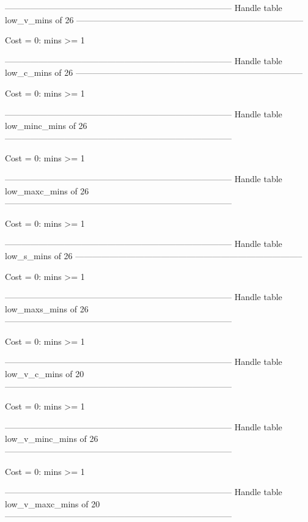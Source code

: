 --------------------------------------------------------------------------------
Handle table low_v_mins of 26
--------------------------------------------------------------------------------

Cost =  0:  mins >= 1

--------------------------------------------------------------------------------
Handle table low_c_mins of 26
--------------------------------------------------------------------------------

Cost =  0:  mins >= 1

--------------------------------------------------------------------------------
Handle table low_minc_mins of 26
--------------------------------------------------------------------------------

Cost =  0:  mins >= 1

--------------------------------------------------------------------------------
Handle table low_maxc_mins of 26
--------------------------------------------------------------------------------

Cost =  0:  mins >= 1

--------------------------------------------------------------------------------
Handle table low_s_mins of 26
--------------------------------------------------------------------------------

Cost =  0:  mins >= 1

--------------------------------------------------------------------------------
Handle table low_maxs_mins of 26
--------------------------------------------------------------------------------

Cost =  0:  mins >= 1

--------------------------------------------------------------------------------
Handle table low_v_c_mins of 20
--------------------------------------------------------------------------------

Cost =  0:  mins >= 1

--------------------------------------------------------------------------------
Handle table low_v_minc_mins of 26
--------------------------------------------------------------------------------

Cost =  0:  mins >= 1

--------------------------------------------------------------------------------
Handle table low_v_maxc_mins of 20
--------------------------------------------------------------------------------

